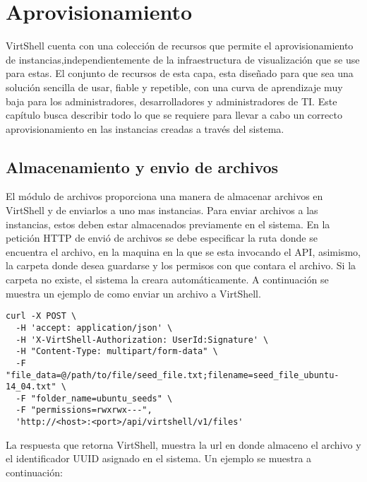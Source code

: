 \chapter{Aprovisionamiento}
\label{capaprovisionamiento}

VirtShell cuenta con una colección de recursos que permite el aprovisionamiento de instancias,independientemente de la infraestructura de visualización que se use para estas. El conjunto de recursos de esta capa, esta diseñado para que sea una solución sencilla de usar, fiable y repetible, con una curva de aprendizaje muy baja para los administradores, desarrolladores y administradores de TI. Este capítulo busca describir todo lo que se requiere para llevar a cabo un correcto aprovisionamiento en las instancias creadas a través del sistema.

\section{Almacenamiento y envio de archivos}
El módulo de archivos proporciona una manera de almacenar archivos en VirtShell y de enviarlos a uno mas instancias. Para enviar archivos a las instancias, estos deben estar almacenados previamente en el sistema. En la petición HTTP de envió de archivos se debe especificar la ruta donde se encuentra el archivo, en la maquina en la que se esta invocando el API, asimismo, la carpeta donde desea guardarse y los permisos con que contara el archivo. Si la carpeta no existe, el sistema la creara automáticamente. A continuación se muestra un ejemplo de como enviar un archivo a VirtShell.

\vspace{5mm}

\begin{lstlisting}[style=json, caption=Petición HTTP para subir un archivo al sistema]
curl -X POST \
  -H 'accept: application/json' \
  -H 'X-VirtShell-Authorization: UserId:Signature' \
  -H "Content-Type: multipart/form-data" \
  -F "file_data=@/path/to/file/seed_file.txt;filename=seed_file_ubuntu-14_04.txt" \
  -F "folder_name=ubuntu_seeds" \
  -F "permissions=rwxrwx---",
  'http://<host>:<port>/api/virtshell/v1/files'
\end{lstlisting}

\vspace{5mm}

La respuesta que retorna VirtShell, muestra la url en donde almaceno el archivo y el identificador UUID asignado en el sistema. Un ejemplo se muestra a continuación:

